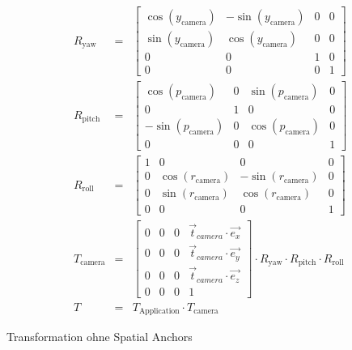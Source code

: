     \begin{floatingequation}[ht!]
        \begin{align}
            R_{\text{yaw}} &=&
            \begin{bmatrix}
                \cos(y_{\text{camera}}) & -\sin(y_{\text{camera}}) & 0 & 0 \\
                \sin(y_{\text{camera}}) & \cos(y_{\text{camera}})  & 0 & 0 \\
                0                       & 0                        & 1 & 0 \\
                0                       & 0                        & 0 & 1
            \end{bmatrix}\\
            R_{\text{pitch}} &=&
            \begin{bmatrix}
                \cos(p_{\text{camera}})  & 0 & \sin(p_{\text{camera}}) & 0 \\
                0                        & 1 & 0                       & 0 \\
                -\sin(p_{\text{camera}}) & 0 & \cos(p_{\text{camera}}) & 0 \\
                0                        & 0 & 0                       & 1
            \end{bmatrix}\\
            R_{\text{roll}} &=&
            \begin{bmatrix}
                1 & 0                       & 0                        & 0 \\
                0 & \cos(r_{\text{camera}}) & -\sin(r_{\text{camera}}) & 0 \\
                0 & \sin(r_{\text{camera}}) & \cos(r_{\text{camera}})  & 0 \\
                0 & 0                       & 0                        & 1
            \end{bmatrix}\\
            T_{\text{camera}} &=&
            \begin{bmatrix}
                0 & 0 & 0 & \vec{t}_{camera}\cdot\vec{e_x} \\
                0 & 0 & 0 & \vec{t}_{camera}\cdot\vec{e_y} \\
                0 & 0 & 0 & \vec{t}_{camera}\cdot\vec{e_z} \\
                0 & 0 & 0 & 1
            \end{bmatrix}
            \cdot R_{\text{yaw}}\cdot R_{\text{pitch}}\cdot R_{\text{roll}}\\
            T &=& T_{\text{Application}}\cdot T_{\text{camera}}
        \end{align}
        \caption{Transformation ohne Spatial Anchors}
        \label{eq:classic-camera-transformation}
    \end{floatingequation}


